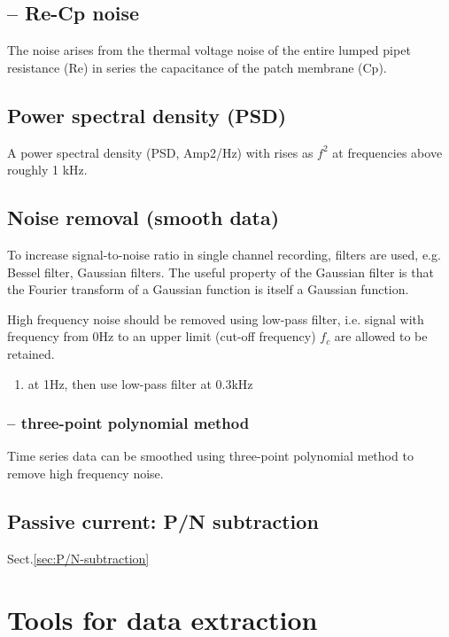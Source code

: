 \section{-- Re-Cp noise}

The noise arises from the thermal voltage noise of the entire lumped pipet
resistance (Re) in series the capacitance
of the patch membrane (Cp).

\section{Power spectral density (PSD)}

A power spectral density (PSD, Amp2/Hz) with rises as
$f^2$ at frequencies above roughly 1 kHz.


\section{Noise removal (smooth data)}
\label{sec:noise-removal}

To increase signal-to-noise ratio in single channel recording, filters
are used, e.g. Bessel filter, Gaussian filters. The useful property of
the Gaussian filter is that the Fourier transform of a Gaussian
function is itself a Gaussian function.

High frequency noise should be removed using low-pass filter, i.e. signal with
frequency from 0Hz to an upper limit (cut-off frequency) $f_c$ are allowed to be
retained.

\begin{enumerate}
  \item at 1Hz, then use low-pass filter at 0.3kHz \citep{flockerzi1986}
\end{enumerate}


\subsection{-- three-point polynomial method}
\label{sec:smooth-data-three-point-polynomial}

Time series data can be smoothed using three-point polynomial method to remove
high frequency noise.


\section{Passive current: P/N subtraction}

Sect.\ref{sec:P/N-subtraction}


\chapter{Tools for data extraction}


